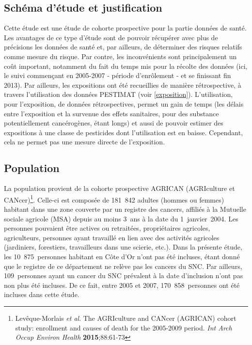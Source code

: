 \documentclass[10pt]{article}
\begin{document}
\subsection{Schéma d'étude et justification}
Cette étude est une étude de cohorte prospective pour la partie données de santé. Les avantages de ce type d'étude sont de pouvoir récupérer avec plus de précisions les données de santé et, par ailleurs, de déterminer des risques relatifs comme mesure du risque. Par contre, les inconvénients sont principalement un coût important, notamment du fait du temps mis pour la récolte des données (ici, le suivi commençant en 2005-2007 - période d'enrôlement - et se finissant fin 2013). 
Par ailleurs, les expositions ont été recueillies de manière rétrospective, à travers l'utilisation des données PESTIMAT (voir \ref{exposition}). L'utilisation, pour l'exposition, de données rétrospectives, permet un gain de temps (les délais entre l'exposition et la survenue des effets sanitaires, pour des substance potentiellement cancérogènes, étant longs) et aussi de pouvoir estimer des expositions à une classe de pesticides dont l'utilisation est en baisse. Cependant, cela ne permet pas une mesure directe de l'exposition. 

\subsection{Population}
La population provient de la cohorte prospective AGRICAN (AGRIculture et CANcer)\footnote{Levêque-Morlais \emph{et al}. The AGRIculture and CANcer (AGRICAN) cohort study: enrollment and causes of death for the 2005-2009 period. \emph{Int Arch Occup Environ Health} \textbf{2015};88:61-73}. Celle-ci est composée de 181~842 adultes (hommes ou femmes) habitant dans une zone couverte par un registre des cancers, affiliés à la Mutuelle sociale agricole (MSA) depuis au moins 3~ans à la date du 1~janvier~2004. Les personnes pouvaient être actives ou retraitées, propriétaires agricoles, agriculteurs, personnes ayant travaillé en lien avec des activités agricoles (jardiniers, forestiers, travailleurs dans une scierie, etc.). Dans la présente étude, les 10~875~personnes habitant en Côte d'Or n'ont pas été incluses, étant donné que le registre de ce département ne relève pas les cancers du SNC. Par ailleurs, 109~personnes ayant un cancer du SNC prévalent à la date d'inclusion n'ont pas non plus été incluses. De ce fait, entre 2005 et 2007, 170~858~personnes ont été incluses dans cette étude.
\end{document}
